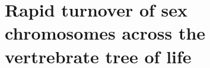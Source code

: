 \chapter{Rapid turnover of sex chromosomes across the vertrebrate tree of life}
\label{chap:sexchrom}

